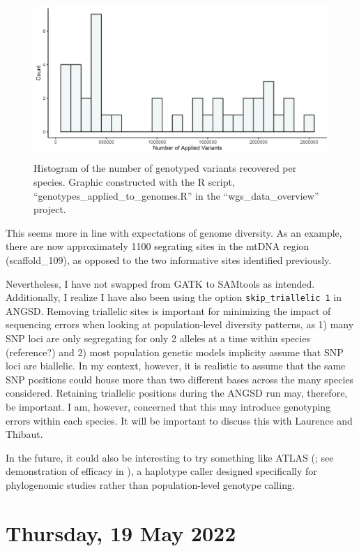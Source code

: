 \documentclass[12pt]{report}
\begin{document}
\begin{figure}[!h]
        \centering
        \includegraphics[height=6cm]{Images/number_of_applied_variants.PNG}
        \caption{Histogram of the number of genotyped variants recovered per species. Graphic constructed with the R script, ``genotypes\_applied\_to\_genomes.R'' in the ``wgs\_data\_overview'' project.}
\end{figure}

This seems more in line with expectations of genome diversity. As an example, there are now approximately 1100 segrating sites in the mtDNA region (scaffold\_109), as opposed to the two informative sites identified previously.

Nevertheless, I have not swapped from GATK to SAMtools as intended. Additionally, I realize I have also been using the option \verb!skip_triallelic 1! in ANGSD. Removing triallelic sites is important for minimizing the impact of sequencing errors when looking at population-level diversity patterns, as 1) many SNP loci are only segregating for only 2 alleles at a time within species (reference?) and 2) most population genetic models implicity assume that SNP loci are biallelic. In my context, however, it is realistic to assume that the same SNP positions could house more than two different bases across the many species considered. Retaining triallelic positions during the ANGSD run may, therefore, be important. I am, however, concerned that this may introduce genotyping errors within each species. It will be important to discuss this with Laurence and Thibaut.

In the future, it could also be interesting to try something like ATLAS (\cite{link2017}; see demonstration of efficacy in \cite{duchen2020}), a haplotype caller designed specifically for phylogenomic studies rather than population-level genotype calling.

\section*{Thursday, 19 May 2022}
\end{document}
